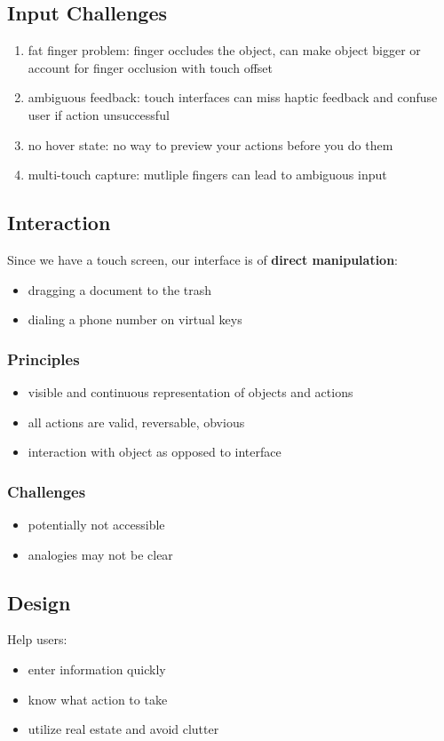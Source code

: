 \documentclass[]{article}
\theoremstyle{definition}
\begin{document}
	\subsection{Input Challenges}
	\begin{enumerate}
		\item fat finger problem: finger occludes the object, can make object bigger or account for finger occlusion with touch offset
		\item ambiguous feedback: touch interfaces can miss haptic feedback and confuse user if action unsuccessful
		\item no hover state: no way to preview your actions before you do them
		\item multi-touch capture: mutliple fingers can lead to ambiguous input
	\end{enumerate}

	\subsection{Interaction}
	Since we have a touch screen, our interface is of \textbf{direct manipulation}:
	\begin{itemize}
		\item dragging a document to the trash
		\item dialing a phone number on virtual keys
	\end{itemize}
	\subsubsection{Principles}
	\begin{itemize}
		\item visible and continuous representation of objects and actions
		\item all actions are valid, reversable, obvious
		\item interaction with object as opposed to interface
	\end{itemize}
	\subsubsection{Challenges}
	\begin{itemize}
		\item potentially not accessible
		\item analogies may not be clear
	\end{itemize}

	\subsection{Design}
	Help users:
	\begin{itemize}
		\item enter information quickly
		\item know what action to take
		\item utilize real estate and avoid clutter 
	\end{itemize}
\end{document}
